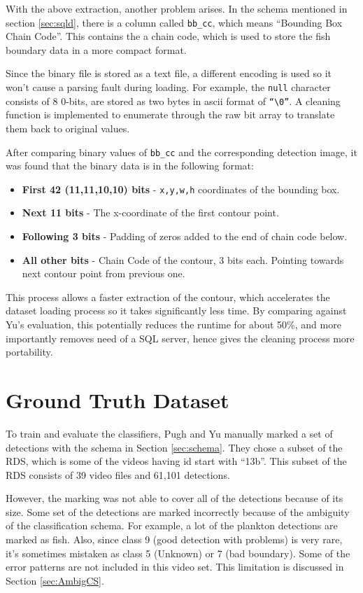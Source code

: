 \documentclass[bsc,logo,twoside,fullspacing,parskip]{infthesis}
\begin{document}
With the above extraction, another problem arises. 
In the schema mentioned in section \ref{sec:sqld}, there is a column called {\tt bb\_cc}, which means ``Bounding Box Chain Code''. 
This contains the  a chain code, which is used to store the fish boundary data in a more compact format.

Since the binary file is stored as a text file, a different encoding is used so it won't cause a parsing fault during loading.
For example, the {\tt null} character consists of 8 0-bits, are stored as two bytes in ascii format of {\tt ``\textbackslash0''}. A cleaning function is implemented to enumerate through the raw bit array to translate them back to original values.

After comparing binary values of {\tt bb\_cc} and the corresponding detection image, it was found that the binary data is in the following format:
\begin{itemize}
\setlength{\parskip}{1pt}
\item
\textbf{First 42 (11,11,10,10) bits} - {\tt x,y,w,h} coordinates of the bounding box.
\item
\textbf{Next 11 bits} - The x-coordinate of the first contour point.
\item
\textbf{Following 3 bits} - Padding of zeros added to the end of chain code below.
\item
\textbf{All other bits} - Chain Code of the contour, 3 bits each. Pointing towards next contour point from previous one. 
\end{itemize}

This process allows a faster extraction of the contour, which accelerates the dataset loading process so it takes significantly less time. 
By comparing against Yu's\cite{Yu} evaluation, this potentially reduces the runtime for about 50\%, and more importantly removes need of a SQL server, hence gives the cleaning process more portability.

\section{Ground Truth Dataset}
\label{sec:gt}

To train and evaluate the classifiers, Pugh and Yu manually marked a set of detections with the schema in Section \ref{sec:schema}. 
They chose a subset of the RDS, which is some of the videos having id start with ``13b''. 
This subset of the RDS consists of 39 video files and 61,101 detections. 

However, the marking was not able to cover all of the detections because of its size. 
Some set of the detections are marked incorrectly because of the ambiguity of the classification schema. 
For example, a lot of the plankton detections are marked as fish. 
Also, since class 9 (good detection with problems) is very rare, it's sometimes mistaken as class 5 (Unknown) or 7 (bad boundary). Some of the error patterns are not included in this video set. This limitation is discussed in Section \ref{sec:AmbigCS}.
\end{document}
